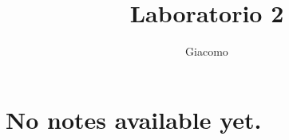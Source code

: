\documentclass{article}
\title{Laboratorio 2}
\author{Giacomo}
\begin{document}
\maketitle

\section*{No notes available yet.}
\end{document}
